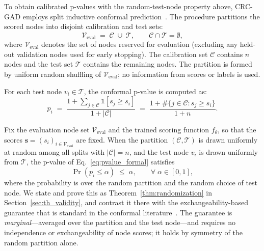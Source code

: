 \documentclass[a4paper]{cas-dc}
\theoremstyle{definition}
\begin{document}
To obtain calibrated p-values with the random-test-node property above, CRC-GAD employs split inductive conformal prediction~\cite{vovk2005algorithmic,papadopoulos2002inductive}.  The procedure partitions the scored nodes into disjoint calibration and test sets:
\begin{equation}
\label{eq:partition}
    \mathcal{V}_{\text{eval}} \;=\; \mathcal{C} \;\cup\; \mathcal{T}, \qquad \mathcal{C} \cap \mathcal{T} = \emptyset,
\end{equation}
where $\mathcal{V}_{\text{eval}}$ denotes the set of nodes reserved for evaluation (excluding any held-out validation nodes used for early stopping).  The calibration set $\mathcal{C}$ contains $n$ nodes and the test set $\mathcal{T}$ contains the remaining nodes.  The partition is formed by uniform random shuffling of $\mathcal{V}_{\text{eval}}$; no information from scores or labels is used.

For each test node $v_i \in \mathcal{T}$, the conformal p-value is computed as:
\begin{equation}
\label{eq:pvalue_formal}
    p_i \;=\; \frac{1 + \sum_{j \in \mathcal{C}} \mathbb{1}[s_j \geq s_i]}{1 + |\mathcal{C}|} \;=\; \frac{1 + \#\{j \in \mathcal{C} : s_j \geq s_i\}}{1 + n}.
\end{equation}

Fix the evaluation node set $\mathcal{V}_{\text{eval}}$ and the trained scoring function $f_\theta$, so that the scores $\mathbf{s} = (s_i)_{i \in \mathcal{V}_{\text{eval}}}$ are fixed.  When the partition $(\mathcal{C}, \mathcal{T})$ is drawn uniformly at random among all splits with $|\mathcal{C}| = n$, and the test node $v_i$ is drawn uniformly from $\mathcal{T}$, the p-value of Eq.~\eqref{eq:pvalue_formal} satisfies
\begin{equation}
\label{eq:validity}
    \Pr(p_i \leq \alpha) \;\leq\; \alpha, \qquad \forall\; \alpha \in [0,1],
\end{equation}
where the probability is over the random partition and the random choice of test node.  We state and prove this as Theorem~\ref{thm:randomization} in Section~\ref{sec:th_validity}, and contrast it there with the exchangeability-based guarantee that is standard in the conformal literature~\cite{vovk2005algorithmic}.  The guarantee is \emph{marginal}---averaged over the partition and the test node---and requires no independence or exchangeability of node scores; it holds by symmetry of the random partition alone.
\end{document}
